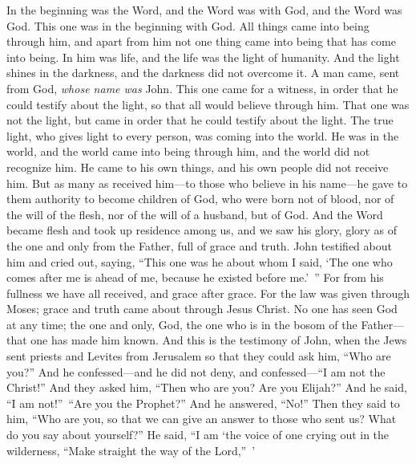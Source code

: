
\begin{biblechapter} %
 In the beginning was the Word, and the Word was with God, and the Word was God.
\verse This one was in the beginning with God.
\verse All things came into being through him, and apart from him not one thing came into being that has come into being.
\verse In him was life, and the life was the light of humanity.
\verse And the light shines in the darkness, and the darkness did not overcome it.
\verse A man came, sent from God, \textit{whose name was} John.
\verse This one came for a witness, in order that he could testify about the light, so that all would believe through him.
\verse That one was not the light, but came in order that he could testify about the light.
\verse The true light, who gives light to every person, was coming into the world.
\verse He was in the world, and the world came into being through him, and the world did not recognize him.
\verse He came to his own things, and his own people did not receive him.
\verse But as many as received him—to those who believe in his name—he gave to them authority to become children of God,
\verse who were born not of blood, nor of the will of the flesh, nor of the will of a husband, but of God.
\verse And the Word became flesh and took up residence among us, and we saw his glory, glory as of the one and only from the Father, full of grace and truth.
\verse John testified about him and cried out, saying, “This one was he about whom I said, ‘The one who comes after me is ahead of me, because he existed before me.’ ”
\verse For from his fullness we have all received, and grace after grace.
\verse For the law was given through Moses; grace and truth came about through Jesus Christ.
\verse No one has seen God at any time; the one and only, God, the one who is in the bosom of the Father—that one has made him known.
 And this is the testimony of John, when the Jews sent priests and Levites from Jerusalem so that they could ask him, “Who are you?”
\verse And he confessed—and he did not deny, and confessed—“I am not the Christ!”
\verse And they asked him, “Then who are you? Are you Elijah?” And he said, “I am not!” “Are you the Prophet?” And he answered, “No!”
\verse Then they said to him, “Who are you, so that we can give an answer to those who sent us? What do you say about yourself?”
\verse He said, “I am ‘the voice of one crying out in the wilderness, 
“Make straight the way of the Lord,” ’

\end{biblechapter}

